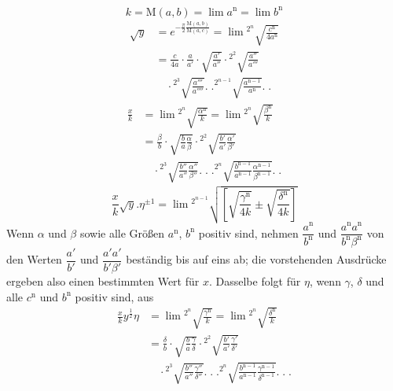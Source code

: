 \[
k=\mathrm M(a,b)=\lim a^{\mathrm n}=\lim b^{\mathrm n}
\]
\[
\begin{aligned}
\surd y&=e^{-\frac\pi2\frac{\mathrm M(a,b)}{\mathrm M(a,c)}}
=\lim{}^{2^n}\!\surd{\frac{c^{\mathrm n}}{4a^{\mathrm n}}}\\
&=\frac{c}{4a}\cdot\frac a{a'}\cdot\surd{\frac{a'}{a''}}
\cdot{}^{2^2}\!\surd{\frac{a''}{a'''}}\\&\quad\cdot{}^{2^3}\!\surd{\frac{a'''}{a''''}}
.\;.{}^{2^{n-1}}\!\surd{\frac{a^{\mathrm n-1}}{a^{\mathrm n}}}.\;.
\end{aligned}
\]
\[
\begin{aligned}
\frac xk&=\lim{}^{2^n}\!\surd{\frac{\alpha^{\mathrm n}}{k}}
=\lim{}^{2^n}\!\surd{\frac{\beta^{\mathrm n}}{k}}\\
&=\frac\beta b\cdot\surd{\frac ba\frac\alpha\beta}
\cdot{}^{2^2}\!\surd{\frac{b'}{a'}\frac{\alpha'}{\beta'}}
\\&\quad\cdot{}^{2^3}\!\surd{\frac{b''}{a''}\frac{\alpha''}{\beta''}}
.\;.\;.{}^{2^n}\!\surd{\frac{b^{\mathrm n-1}}{a^{\mathrm n-1}}\frac{\alpha^{\mathrm n-1}}{\beta^{\mathrm n-1}}}.\;.
\end{aligned}
\]
\[
\frac xk\surd y.\eta^{\pm1}
=\lim{}^{2^{n-1}}\!\surd{\left[\surd{\frac{\gamma^{\mathrm n}}{4k}}\pm\surd{\frac{\delta^{\mathrm n}}{4k}}\right]}
\]
Wenn $\alpha$ und $\beta$ sowie alle Größen $a^{\mathrm n}$, $b^{\mathrm n}$ positiv sind, nehmen
$\dfrac{a^{\mathrm n}}{b^{\mathrm n}}$ und $\dfrac{a^{\mathrm n}a^{\mathrm n}}{b^{\mathrm n}\beta^{\mathrm n}}$ von den Werten
$\dfrac{a'}{b'}$ und $\dfrac{a'a'}{b'\beta'}$ beständig bis auf eins ab;
die vorstehenden Ausdrücke ergeben also einen bestimmten Wert für $x$.
Dasselbe folgt für $\eta$, wenn $\gamma$, $\delta$ und alle $c^{\mathrm n}$ und $b^{\mathrm n}$ positiv sind, aus
\[
\begin{aligned}
\frac xk y^{\frac12}\eta&=\lim{}^{2^n}\!\surd{\frac{\gamma^{\mathrm n}}{k}}
=\lim{}^{2^n}\!\surd{\frac{\delta^{\mathrm n}}{k}}\\
&=\frac\delta b\cdot\surd{\frac ba\frac\gamma\delta}
\cdot{}^{2^2}\!\surd{\frac{b'}{a'}\frac{\gamma'}{\delta'}}
\\&\quad\cdot{}^{2^3}\!\surd{\frac{b''}{a''}\frac{\gamma''}{\delta''}}
.\;.\;.{}^{2^n}\!\surd{\frac{b^{\mathrm n-1}}{a^{\mathrm n-1}}\frac{\gamma^{\mathrm n-1}}{\delta^{\mathrm n-1}}}.\;.\;.
\end{aligned}
\]
